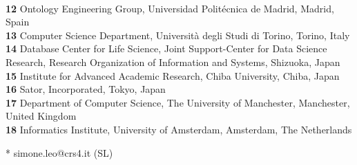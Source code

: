 \documentclass[10pt,letterpaper]{article}
\begin{document}
\begin{flushleft}
\\
\textbf{12} Ontology Engineering Group, Universidad Politécnica de Madrid, Madrid, Spain
\\
\textbf{13} Computer Science Department, Università degli Studi di Torino, Torino, Italy
\\
\textbf{14} Database Center for Life Science, Joint Support-Center for Data Science Research, Research Organization of Information and Systems, Shizuoka, Japan
\\
\textbf{15} Institute for Advanced Academic Research, Chiba University, Chiba, Japan
\\
\textbf{16} Sator, Incorporated, Tokyo, Japan
\\
\textbf{17} Department of Computer Science, The University of Manchester, Manchester, United Kingdom
\\
\textbf{18} Informatics Institute, University of Amsterdam, Amsterdam, The Netherlands
\\
\bigskip

% 
%





* simone.leo@crs4.it (SL)

\end{flushleft}
\end{document}
